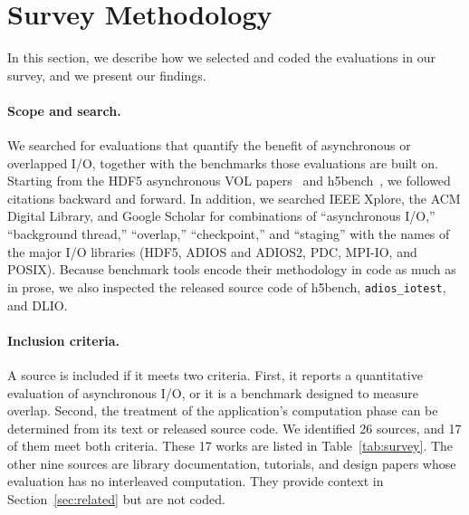 \section{Survey Methodology}
\label{sec:survey}

In this section, we describe how we selected and coded the evaluations in
our survey, and we present our findings.

\paragraph{Scope and search.} We searched for evaluations that quantify the
benefit of asynchronous or overlapped I/O, together with the benchmarks those
evaluations are built on. Starting from the HDF5 asynchronous VOL
papers~\cite{tang2019async,tang2022async} and h5bench~\cite{li2021h5bench},
we followed citations backward and forward. In addition, we searched IEEE
Xplore, the ACM Digital Library, and Google Scholar for combinations of
``asynchronous I/O,'' ``background thread,'' ``overlap,'' ``checkpoint,'' and
``staging'' with the names of the major I/O libraries (HDF5, ADIOS and
ADIOS2, PDC, MPI-IO, and POSIX). Because benchmark tools encode their
methodology in code as much as in prose, we also inspected the released
source code of h5bench, \texttt{adios\_iotest}, and DLIO.

\paragraph{Inclusion criteria.} A source is included if it meets two
criteria. First, it reports a quantitative evaluation of asynchronous I/O, or
it is a benchmark designed to measure overlap. Second, the treatment of the
application's computation phase can be determined from its text or released
source code. We identified 26 sources, and 17 of them meet both criteria.
These 17 works are listed in Table~\ref{tab:survey}. The other nine sources
are library documentation, tutorials, and design papers whose evaluation has
no interleaved computation. They provide context in
Section~\ref{sec:related} but are not coded.

